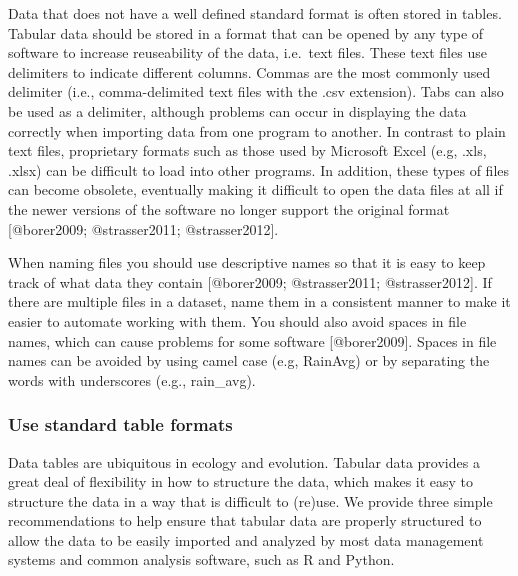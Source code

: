 Data that does not have a well defined standard format is often stored
in tables. Tabular data should be stored in a format that can be opened
by any type of software to increase reuseability of the data, i.e.~text
files. These text files use delimiters to indicate different columns.
Commas are the most commonly used delimiter (i.e., comma-delimited text
files with the .csv extension). Tabs can also be used as a delimiter,
although problems can occur in displaying the data correctly when
importing data from one program to another. In contrast to plain text
files, proprietary formats such as those used by Microsoft Excel (e.g,
.xls, .xlsx) can be difficult to load into other programs. In addition,
these types of files can become obsolete, eventually making it difficult
to open the data files at all if the newer versions of the software no
longer support the original format {[}@borer2009; @strasser2011;
@strasser2012{]}.

When naming files you should use descriptive names so that it is easy to
keep track of what data they contain {[}@borer2009; @strasser2011;
@strasser2012{]}. If there are multiple files in a dataset, name them in
a consistent manner to make it easier to automate working with them. You
should also avoid spaces in file names, which can cause problems for
some software {[}@borer2009{]}. Spaces in file names can be avoided by
using camel case (e.g, RainAvg) or by separating the words with
underscores (e.g., rain\_avg).

\subsubsection{Use standard table
formats}\label{use-standard-table-formats}

Data tables are ubiquitous in ecology and evolution. Tabular data
provides a great deal of flexibility in how to structure the data, which
makes it easy to structure the data in a way that is difficult to
(re)use. We provide three simple recommendations to help ensure that
tabular data are properly structured to allow the data to be easily
imported and analyzed by most data management systems and common
analysis software, such as R and Python.

